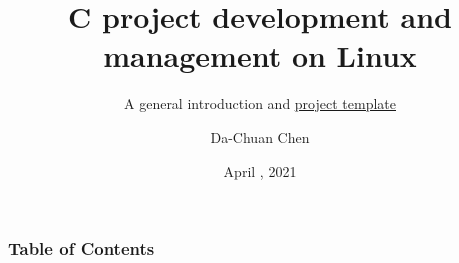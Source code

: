 \documentclass{beamer}
\title[C project] %
{C project development and management on Linux}
\subtitle{A general introduction and \href{https://github.com/belongtothenight/autotools_init_setup}{\underline{project template}}}
\author[\href{https://github.com/belongtothenight/}{\underline{belongtothenight}}] %
{Da-Chuan Chen}
\date[20240907] %
{April \nth{7}, 2021}
\begin{document}
\frame{\titlepage}

\begin{frame}
\frametitle{Table of Contents}
\tableofcontents
\end{frame}







\end{document}
